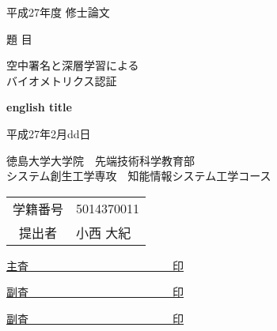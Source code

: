 \documentclass[12pt,twoside]{jreport}  %
\begin{document}
\begin{titlepage}
\begin{center}
\Large

平成27年度 修士論文\\
\vspace*{3zh}

題 目 \\

\vspace*{3zh}

{\Huge
  空中署名と深層学習による\\バイオメトリクス認証\\
}

\vspace*{2zh}

{\Large\bf
  english title\\
}

\normalsize
\vspace*{2zh}

平成27年2月dd日\\

\vspace*{2zh}


徳島大学大学院　先端技術科学教育部\\
システム創生工学専攻　知能情報システム工学コース\\

\vspace*{3zh}

\begin{table} [h!]
  \centering
  \begin{tabular} {cl}
      学籍番号 & 5014370011\\
      提出者 & 小西 大紀
  \end{tabular}
\end{table}

\Large
\vspace*{3zh}

\underline{主査　　　　　　　　　　　　　{\normalsize 印}}

\vspace*{1zh}

\underline{副査　　　　　　　　　　　　　{\normalsize 印}}

\vspace*{1zh}

\underline{副査　　　　　　　　　　　　　{\normalsize 印}}

\vspace*{5mm}
\end{center}
\end{titlepage}
\end{document}
